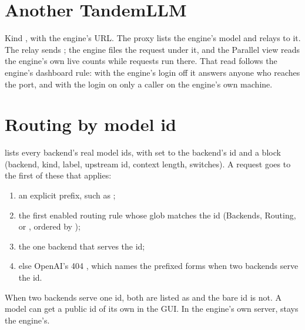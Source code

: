 \section{Another TandemLLM}

Kind , with the engine's URL. The proxy lists the engine's  model and relays to it. The relay sends ; the engine files the request under it, and the Parallel view reads the engine's own live counts while requests run there. That read follows the engine's dashboard rule: with the engine's login off it answers anyone who reaches the port, and with the login on only a caller on the engine's own machine.

\section{Routing by model id}\label{sec:routing}

 lists every backend's real model ids, with  set to the backend's id and a  block (backend, kind, label, upstream id, context length, switches). A request goes to the first of these that applies:

\begin{enumerate}
\item an explicit  prefix, such as ;
\item the first enabled routing rule whose glob matches the id (Backends, Routing, or , ordered by );
\item the one backend that serves the id;
\item else OpenAI's 404 , which names the prefixed forms when two backends serve the id.
\end{enumerate}

When two backends serve one id, both are listed as  and the bare id is not. A model can get a public id of its own in the GUI. In the engine's own server,  stays the engine's.

